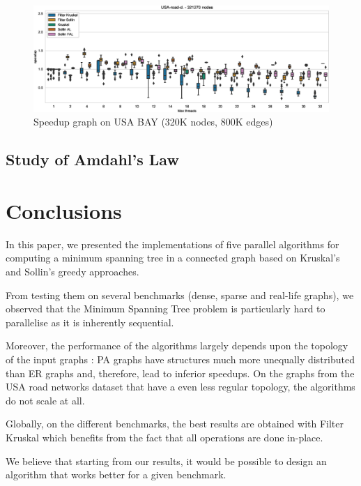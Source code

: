\documentclass[letterpaper]{article}
\begin{document}
\begin{figure}\centering
  \includegraphics[width=\linewidth]{graphics/Box_Speedup_USA-road-d._321270.eps}
  \caption{Speedup graph on USA BAY (320K nodes, 800K edges)\label{usaBAYspeedup}}
\end{figure}


\subsection{Study of Amdahl's Law}



\section{Conclusions}

In this paper, we presented the implementations of five parallel algorithms for computing a minimum spanning tree in a connected graph based on Kruskal's and Sollin's greedy approaches.

From testing them on several benchmarks (dense, sparse and real-life graphs), we observed that the Minimum Spanning Tree problem is particularly hard to parallelise as it is inherently sequential. 

Moreover, the performance of the algorithms largely depends upon the topology of the input graphs : PA graphs have structures much more unequally distributed than ER graphs and, therefore, lead to inferior speedups. On the graphs from the USA road networks dataset that have a even less regular topology, the algorithms do not scale at all.

Globally, on the different benchmarks, the best results are obtained with Filter Kruskal which benefits from the fact that all operations are done in-place.

We believe that starting from our results, it would be possible to design an algorithm that works better for a given benchmark.


\clearpage



\end{document}
